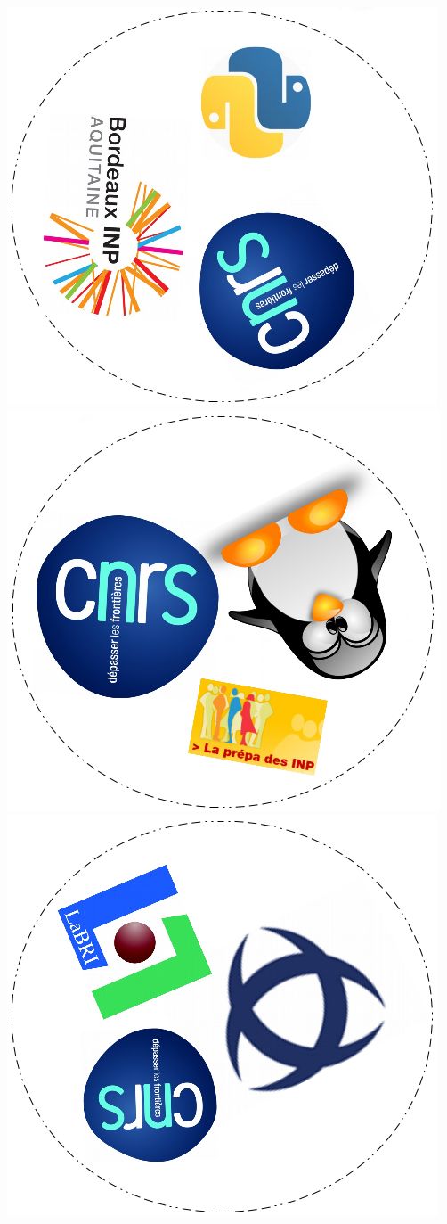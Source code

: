 \documentclass[a4paper]{article}
\begin{document}
\includegraphics[scale=0.43]{dobble5.png}
\includegraphics[scale=0.43]{dobble6.png}\\
\includegraphics[scale=0.43]{dobble7.png}
\end{document}
